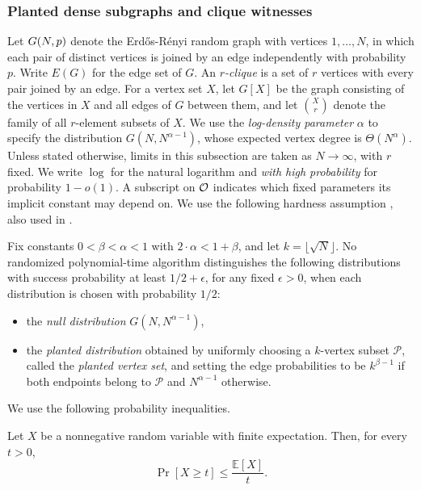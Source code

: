 \subsubsection{Planted dense subgraphs and clique witnesses}
Let $G\mathopen{}\left( N,p \right)$ denote the Erd\H{o}s-R\'enyi random graph with vertices $1,\ldots,N$, in which each pair of distinct vertices is joined by an edge independently with probability $p$. Write $E(G)$ for the edge set of $G$. An \emph{$r$-clique} is a set of $r$ vertices with every pair joined by an edge. For a vertex set $X$, let $G[X]$ be the graph consisting of the vertices in $X$ and all edges of $G$ between them, and let $\binom{X}{r}$ denote the family of all $r$-element subsets of $X$. We use the \emph{log-density parameter} $\alpha$ to specify the distribution $G(N,N^{\alpha-1})$, whose expected vertex degree is $\Theta(N^\alpha)$.
Unless stated otherwise, limits in this subsection are taken as $N\to\infty$, with $r$ fixed. We write $\log$ for the natural logarithm and \emph{with high probability} for probability $1-o(1)$. A subscript on $\mathcal{O}$ indicates which fixed parameters its implicit constant may depend on.
We use the following hardness assumption \cite{OnApproxTargetSetSelection}, also used in \cite{PCMSSC}.
\begin{conjecture} \label{problem:PDS}
    Fix constants $0<\beta<\alpha<1$ with $2\cdot\alpha<1+\beta$, and let $k=\lfloor\sqrt{N}\rfloor$. No randomized polynomial-time algorithm distinguishes the following distributions with success probability at least $1/2+\epsilon$, for any fixed $\epsilon>0$, when each distribution is chosen with probability $1/2$:
    \begin{itemize}
        \item the \emph{null distribution} $G(N,N^{\alpha-1})$,
        \item the \emph{planted distribution} obtained by uniformly choosing a $k$-vertex subset $\mathcal{P}$, called the \emph{planted vertex set}, and setting the edge probabilities to be $k^{\beta-1}$ if both endpoints belong to $\mathcal{P}$ and $N^{\alpha-1}$ otherwise.
    \end{itemize}
\end{conjecture}

We use the following probability inequalities.
\begin{theorem}\label{thm:markov}
    Let $X$ be a nonnegative random variable with finite expectation. Then, for every $t>0$,
    \[
        \Pr[X\geq t]\leq\frac{\mathbb{E}[X]}{t}.
    \]
\end{theorem}

